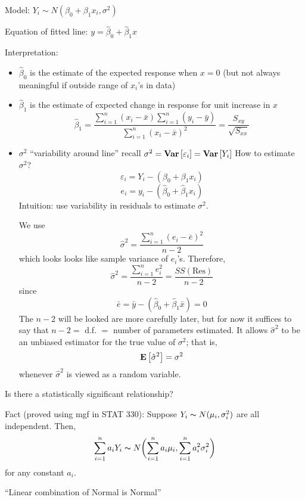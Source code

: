 Model: $ Y_i \sim N(\beta_0+\beta_1x_i,\sigma^2) $

Equation of fitted line: $ y=\hat{\beta}_0+\hat{\beta}_1x $

Interpretation:
\begin{itemize}
    \item $ \hat{\beta}_0 $ is the estimate
          of the expected response when $ x=0 $ (but not always
          meaningful if outside range of $ x_i $'s in data)
    \item $ \hat{\beta}_1 $ is the estimate of
          expected change in response for unit increase in $ x $
          \[ \hat{\beta}_1=\frac{\sum\limits_{i=1}^{n}(x_i-\bar{x})
                  \sum\limits_{i=1}^{n} (y_i-\bar{y})}{
                  \sum\limits_{i=1}^{n} (x_i-\bar{x})^2
              }=\frac{S_{xy}}{\sqrt{S_{xx}}}   \]
    \item $ \sigma^2 $
          ``variability around line''
          recall $ \sigma^2=\bm{\mathrm{Var}}\left[\varepsilon_i\right]=\bm{\mathrm{Var}}\left[Y_i\right] $
          How to estimate $ \sigma^2 $?
          \[ \varepsilon_i=Y_i-(\beta_0+\beta_1x_i) \]
          \[ e_i=y_i-(\hat{\beta}_0+\hat{\beta}_1x_i) \]
          Intuition: use variability in residuals to estimate
          $ \sigma^2 $.

          We use \[ \hat{\sigma}^2
              =\frac{\sum\limits_{i=1}^{n} (e_i-\bar{e})^2}{n-2} \]
          which looks looks like sample variance of $ e_i $'s. Therefore,
          \[ \hat{\sigma}^2=\frac{\sum\limits_{i=1}^{n} e_i^2}{n-2}=
              \frac{SS(\text{Res})}{n-2} \]
          since
          \[ \bar{e}=\bar{y}-(\hat{\beta}_0+\hat{\beta}_1\bar{x})=0 \]
          The $ n-2 $ will be looked are more carefully later, but for now
          it suffices to say that $ n-2= $ d.f. $ = $ number of parameters
          estimated. It allows $ \hat{\sigma}^2 $ to be an unbiased estimator
          for the true value of $ \sigma^2 $; that is,
          \[ \bm{\mathrm{E}}\left[\hat{\sigma}^2\right]=\sigma^2 \]
          whenever $ \hat{\sigma}^2 $ is viewed as a random variable.
\end{itemize}

Is there a statistically significant relationship?

Fact (proved using mgf in STAT 330): Suppose $ Y_i \thicksim N(\mu_i,\sigma_i^2) $
are all independent. Then,
\[ \sum\limits_{i=1}^{n} a_i Y_i \thicksim N
    \biggl( \sum\limits_{i=1}^{n} a_i\mu_i,\sum\limits_{i=1}^{n} a_i^2\sigma_i^2 \biggr) \]
for any constant $ a_i $.

``Linear combination of Normal is Normal''

